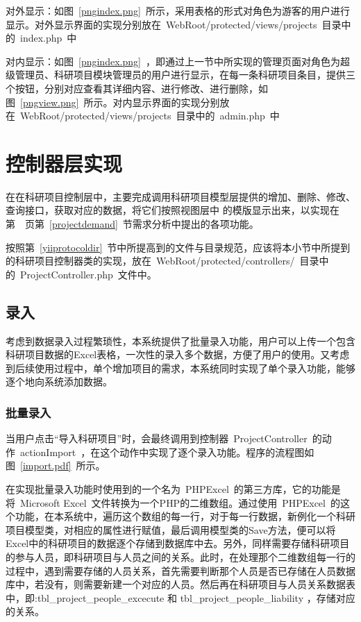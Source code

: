 对外显示：如图~\ref{pngindex.png}~所示，采用表格的形式对角色为游客的用户进行显示。对外显示界面的实现分别放在~WebRoot/protected/views/projects~目录中的~index.php~中


对内显示：如图~\ref{pngindex.png}~，即通过上一节中所实现的管理页面对角色为超级管理员、科研项目模块管理员的用户进行显示，在每一条科研项目条目，提供三个按钮，分别对应查看其详细内容、进行修改、进行删除，如图~\ref{pngview.png}~所示。对内显示界面的实现分别放在~WebRoot/protected/views/projects~目录中的~admin.php~中




\section{控制器层实现}

在在科研项目控制层中，主要完成调用科研项目模型层提供的增加、删除、修改、查询接口，获取对应的数据，将它们按照视图层中
的模版显示出来，以实现在第~\pageref{projectdemand}~页第~\ref{projectdemand}~节需求分析中提出的各项功能。

按照第~\ref{yiiprotocoldir}~节中所提高到的文件与目录规范，应该将本小节中所提到的科研项目控制器类的实现，放在~WebRoot/protected/controllers/~目录中的~ProjectController.php~文件中。

\subsection{录入}
考虑到数据录入过程繁琐性，本系统提供了批量录入功能，用户可以上传一个包含科研项目数据的Excel表格，一次性的录入多个数据，方便了用户的使用。又考虑到后续使用过程中，单个增加项目的需求，本系统同时实现了单个录入功能，能够逐个地向系统添加数据。


\label{controllercreate}

\subsubsection{批量录入}
当用户点击“导入科研项目”时，会最终调用到控制器~ProjectController~的动作~actionImport~，在这个动作中实现了逐个录入功能。程序的流程图如图~\ref{import.pdf}~所示。

在实现批量录入功能时使用到的一个名为~PHPExcel~的第三方库，它的功能是将~Microsoft Excel~文件转换为一个PHP的二维数组。通过使用~PHPExcel~的这个功能，在本系统中，遍历这个数组的每一行，对于每一行数据，新例化一个科研项目模型类，对相应的属性进行赋值，最后调用模型类的Save方法，便可以将Excel中的科研项目的数据逐个存储到数据库中去。另外，同样需要存储科研项目的参与人员，即科研项目与人员之间的关系。此时，在处理那个二维数组每一行的过程中，遇到需要存储的人员关系，首先需要判断那个人员是否已存储在人员数据库中，若没有，则需要新建一个对应的人员。然后再在科研项目与人员关系数据表中，即:tbl\_project\_people\_excecute 和 tbl\_project\_people\_liability ，存储对应的关系。

